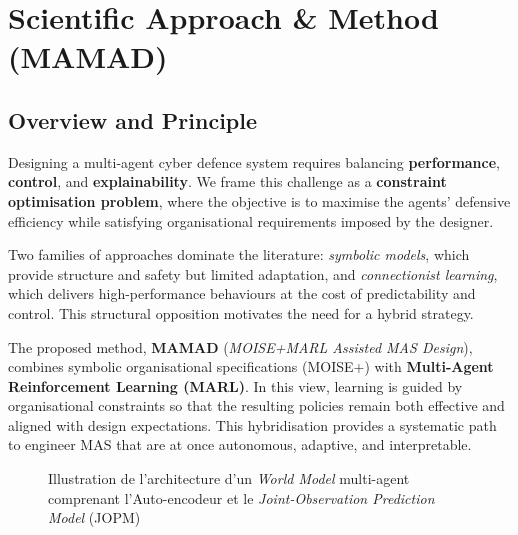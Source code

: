 \documentclass[a4paper,10pt,twocolumn]{article}
\begin{document}
\section{Scientific Approach \& Method (MAMAD)}

\subsection*{Overview and Principle}

Designing a multi-agent cyber defence system requires balancing
\textbf{performance}, \textbf{control}, and \textbf{explainability}.
We frame this challenge as a \textbf{constraint optimisation problem},
where the objective is to maximise the agents’ defensive efficiency
while satisfying organisational requirements imposed by the designer.

Two families of approaches dominate the literature:
\emph{symbolic models}, which provide structure and safety but limited
adaptation, and \emph{connectionist learning}, which delivers
high-performance behaviours at the cost of predictability and control.
This structural opposition motivates the need for a hybrid strategy.

The proposed method, \textbf{MAMAD} (\textit{MOISE+MARL Assisted MAS Design}),
combines symbolic organisational specifications (MOISE+) with
\textbf{Multi-Agent Reinforcement Learning (MARL)}. In this view,
learning is guided by organisational constraints so that the resulting
policies remain both effective and aligned with design expectations.
This hybridisation provides a systematic path to engineer MAS that are
at once autonomous, adaptive, and interpretable.

\begin{figure}[h!]
    \centering
    \caption{Illustration de l'architecture d'un \textit{World Model} multi-agent comprenant l'Auto-encodeur et le \textit{Joint-Observation Prediction Model} (JOPM)}
    \label{fig:single_agent_world_model}
\end{figure}
\end{document}
